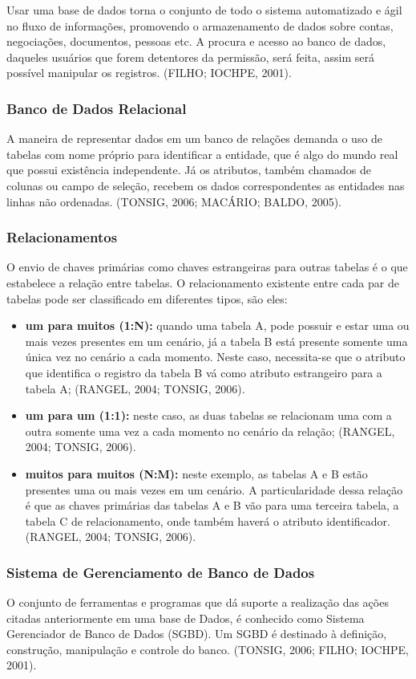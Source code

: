 \documentclass[a4paper,12pt]{article}
\begin{document}
Usar uma base de dados torna o conjunto de todo o sistema automatizado e ágil no fluxo de informações, promovendo o armazenamento 
de dados sobre contas, negociações, documentos, pessoas etc. A procura e acesso ao banco de dados, daqueles usuários que forem detentores 
da permissão, será feita, assim será possível manipular os registros. (FILHO; IOCHPE, 2001).

\subsubsection{Banco de Dados Relacional}
A maneira de representar dados em um banco de relações demanda o uso de tabelas com nome próprio para identificar a entidade, que é 
algo do mundo real que possui existência independente. Já os atributos, também chamados de colunas ou campo de seleção, recebem os 
dados correspondentes as entidades nas linhas não ordenadas. (TONSIG, 2006; MACÁRIO; BALDO, 2005). 

\subsubsection{Relacionamentos}
O envio de chaves primárias como chaves estrangeiras para outras tabelas é o que estabelece a relação entre tabelas. O relacionamento 
existente entre cada par de tabelas pode ser classificado em diferentes tipos, são eles:
\begin{itemize}
	\item\textbf{um para muitos (1:N):} quando uma tabela A, pode possuir e estar uma ou mais vezes presentes em um cenário, já a tabela B está presente somente uma 
	única vez no cenário a cada momento. Neste caso, necessita-se que o atributo que identifica o registro da tabela B vá como atributo estrangeiro para 
	a tabela A; (RANGEL, 2004; TONSIG, 2006).
	\item\textbf{um para um (1:1):} neste caso, as duas tabelas se relacionam uma com a outra somente uma vez a cada momento 
	no cenário da relação; (RANGEL, 2004; TONSIG, 2006).
	\item\textbf{muitos para muitos (N:M):} neste exemplo, as tabelas A e B estão presentes uma ou mais vezes em um cenário. 
	A particularidade dessa relação é que as chaves primárias das tabelas A e B vão para uma terceira tabela, a tabela C de relacionamento, 
	onde também haverá o atributo identificador. (RANGEL, 2004; TONSIG, 2006).
\end{itemize}

\subsubsection{Sistema de Gerenciamento de Banco de Dados}
O conjunto de ferramentas e programas que dá suporte a realização das ações citadas anteriormente em uma base de Dados, é conhecido como 
Sistema Gerenciador de Banco de Dados (SGBD). Um SGBD é destinado à definição, construção, manipulação e controle do banco. (TONSIG, 2006; FILHO; IOCHPE, 2001). 
\end{document}

